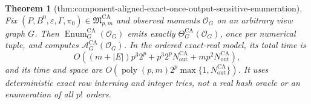 \documentclass{article}
\newtheorem{theorem}{Theorem}
\begin{document}
\begin{theorem}[thm:component-aligned-exact-once-output-sensitive-enumeration]\label{thm:component-aligned-exact-once-output-sensitive-enumeration}
Fix \((P,B^0,\varepsilon,\Gamma,\pi_0)\in\mathfrak M_{p,m}^{\mathrm{CA}}\) and observed moments \(\mathcal O_G\) on an arbitrary view graph \(G\).  Then \(\operatorname{Enum}_G^{\mathrm{CA}}(\mathcal O_G)\) emits exactly \(\Theta_G^{\mathrm{CA}}(\mathcal O_G)\), once per numerical tuple, and computes \(\mathcal A_G^{\mathrm{CA}}(\mathcal O_G)\).  In the ordered exact-real model, its total time is
\[
 O\!\left((m+|E|)p^3 2^p
 +p^3 2^pN_{\mathrm{out}}^{\mathrm{CA}}
 +mp^2N_{\mathrm{out}}^{\mathrm{CA}}\right),
\]
and its time and space are \(O(\operatorname{poly}(p,m)2^p\max\{1,N_{\mathrm{out}}^{\mathrm{CA}}\})\).  It uses deterministic exact row interning and integer tries, not a real hash oracle or an enumeration of all \(p!\) orders.
\end{theorem}
\end{document}
